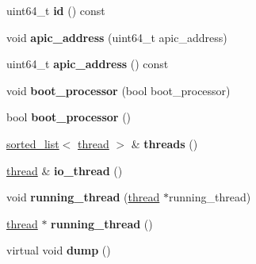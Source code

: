 \begin{DoxyCompactItemize}
\item 
\hypertarget{classprocessor__base_a40f5bc9fb90b7e23247635ce84fdf532}{}uint64\+\_\+t {\bfseries id} () const \label{classprocessor__base_a40f5bc9fb90b7e23247635ce84fdf532}

\item 
\hypertarget{classprocessor__base_af3afa79b3619e41af6b78c4eecdbbd79}{}void {\bfseries apic\+\_\+address} (uint64\+\_\+t apic\+\_\+address)\label{classprocessor__base_af3afa79b3619e41af6b78c4eecdbbd79}

\item 
\hypertarget{classprocessor__base_aba3e940b99ea5de6735ee14b2f7e84ff}{}uint64\+\_\+t {\bfseries apic\+\_\+address} () const \label{classprocessor__base_aba3e940b99ea5de6735ee14b2f7e84ff}

\item 
\hypertarget{classprocessor__base_a7804c678898d2070c1aff039e531f2ee}{}void {\bfseries boot\+\_\+processor} (bool boot\+\_\+processor)\label{classprocessor__base_a7804c678898d2070c1aff039e531f2ee}

\item 
\hypertarget{classprocessor__base_ad06fe0fea02e95026ef5990f9b7e7225}{}bool {\bfseries boot\+\_\+processor} ()\label{classprocessor__base_ad06fe0fea02e95026ef5990f9b7e7225}

\item 
\hypertarget{classprocessor__base_a07fac7030fb43f4204c71ef6148c5716}{}\hyperlink{classsorted__list}{sorted\+\_\+list}$<$ \hyperlink{classthread}{thread} $>$ \& {\bfseries threads} ()\label{classprocessor__base_a07fac7030fb43f4204c71ef6148c5716}

\item 
\hypertarget{classprocessor__base_ae519ab5ed729eb6388417676f81a5cc4}{}\hyperlink{classthread}{thread} \& {\bfseries io\+\_\+thread} ()\label{classprocessor__base_ae519ab5ed729eb6388417676f81a5cc4}

\item 
\hypertarget{classprocessor__base_a077987899bafaebc0e5905941f2eeaad}{}void {\bfseries running\+\_\+thread} (\hyperlink{classthread}{thread} $\ast$running\+\_\+thread)\label{classprocessor__base_a077987899bafaebc0e5905941f2eeaad}

\item 
\hypertarget{classprocessor__base_a7cf10dce7e5bd4669314602aa830eb2e}{}\hyperlink{classthread}{thread} $\ast$ {\bfseries running\+\_\+thread} ()\label{classprocessor__base_a7cf10dce7e5bd4669314602aa830eb2e}

\item 
\hypertarget{classprocessor__base_a6291e61d54d216dc562aaddde308b3a0}{}virtual void {\bfseries dump} ()\label{classprocessor__base_a6291e61d54d216dc562aaddde308b3a0}

\end{DoxyCompactItemize}
